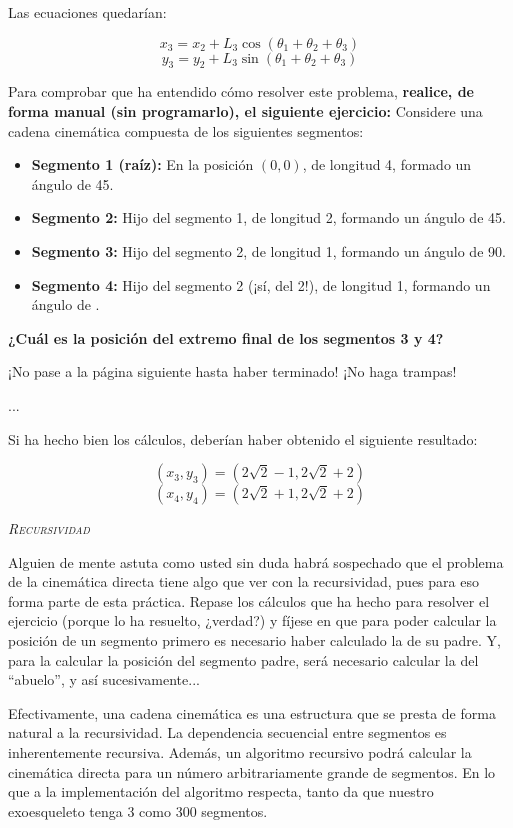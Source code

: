\documentclass[10pt,a4paper,spanish]{article}
\newcommand{\sombreado}[2]{
  \begin{shaded}
    \begin{center} \emph{\textsc{#1}} \end{center}
    \noindent #2\\
  \end{shaded}
}
\begin{document}
Las ecuaciones quedarían:

$$x_3 = x_{2} + L_3 \cos{(\theta_1 + \theta_2 + \theta_3)} $$
$$y_3 = y_{2} + L_3 \sin{(\theta_1 + \theta_2 + \theta_3)} $$

Para comprobar que ha entendido cómo resolver este problema, \textbf{realice, de forma manual (sin programarlo), el siguiente ejercicio:} Considere una cadena cinemática compuesta de los siguientes segmentos:

\begin{itemize}
    \item \textbf{Segmento 1 (raíz):} En la posición $(0,0)$, de longitud 4, formado un ángulo de 45\textdegree.
    \item \textbf{Segmento 2:} Hijo del segmento 1, de longitud 2, formando un ángulo de 45\textdegree.
    \item \textbf{Segmento 3:} Hijo del segmento 2, de longitud 1, formando un ángulo de 90\textdegree.
    \item \textbf{Segmento 4:} Hijo del segmento 2 (¡sí, del 2!), de longitud 1, formando un ángulo de \textdegree.
\end{itemize}

\textbf{¿Cuál es la posición del extremo final de los segmentos 3 y 4?}

\vspace{1cm}

¡No pase a la página siguiente hasta haber terminado! ¡No haga trampas!

\vspace{1cm}

...

\vspace{1cm}

Si ha hecho bien los cálculos, deberían haber obtenido el siguiente resultado:

$$(x_3,y_3) = (2\sqrt{2}-1, 2\sqrt{2}+2)$$
$$(x_4,y_4) = (2\sqrt{2}+1, 2\sqrt{2}+2)$$

\sombreado{Recursividad}{Alguien de mente astuta como usted sin duda habrá sospechado que el problema de la cinemática directa tiene algo que ver con la recursividad, pues para eso forma parte de esta práctica. Repase los cálculos que ha hecho para resolver el ejercicio (porque lo ha resuelto, ¿verdad?) y fíjese en que para poder calcular la posición de un segmento primero es necesario haber calculado la de su padre. Y, para la calcular la posición del segmento padre, será necesario calcular la del ``abuelo'', y así sucesivamente...

Efectivamente, una cadena cinemática es una estructura que se presta de forma natural a la recursividad. La dependencia secuencial entre segmentos es inherentemente recursiva. Además, un algoritmo recursivo podrá calcular la cinemática directa para un número arbitrariamente grande de segmentos. En lo que a la implementación del algoritmo respecta, tanto da que nuestro exoesqueleto tenga 3 como 300 segmentos.}
\end{document}
